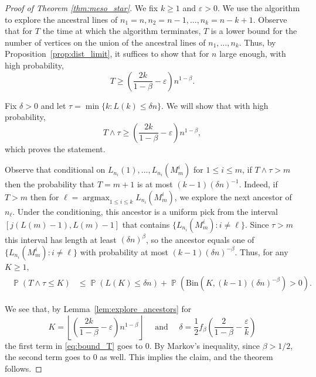 \documentclass[letterpaper,11pt,reqno]{amsart}
\theoremstyle{definition}
\renewcommand{\le}{\leqslant}
\renewcommand{\ge}{\geqslant}
\DeclareMathOperator{\pr}{\mathds{P}}
\DeclareMathOperator{\argmax}{argmax}
\begin{document}
{\begin{proof}[Proof of Theorem \ref{thm:meso_star}]
We fix $k\ge 1$ and $\varepsilon>0$. We use the algorithm to explore the ancestral lines of $n_1=n, n_2=n-1,\dots, n_k=n-k+1$. Observe that for $T$ the time at which the algorithm terminates, $T$ is a lower bound for the number of vertices on the union of the ancestral lines of $n_1,\dots, n_k$. Thus, by Proposition~\ref{prop:dist_limit}, it suffices to show that for  $n$ large enough, with high probability,
\[T\ge \left(  \frac{2k}{1-\beta}-\varepsilon \right)n^{1-\beta} .\] 

Fix $\delta>0$ and let  $\tau=\min\{k:L(k)\le \delta n \}$.
We will show that with high probability, \[T\wedge \tau \ge  \left(  \frac{2k}{1-\beta}-\varepsilon\right) n^{1-\beta},\] which proves the statement. 

Observe that conditional on $L_{n_i}(1), \dots, L_{n_i}(M^i_{m})$ for $1\le i \le m$, if $T\wedge \tau >m$ then the probability that $T=m+1$ is at most $(k-1)(\delta n)^{-1}$. Indeed, if $T>m$ then for $\ell=\argmax_{1\le i\le k}L_{n_i}(M^i_m)$, we explore the next ancestor of $n_\ell$. Under the conditioning, this ancestor is a uniform pick from the interval 
$[j(L(m)-1), L(m)-1]$ that contains $\{L_{n_i}(M^i_m):i\ne\ell\}$. Since $\tau>m$ this interval has length at least $(\delta n)^\beta$, so the ancestor equals one of $\{L_{n_i}(M^i_m):i\ne\ell\}$ with probability at most $(k-1)(\delta n)^{-\beta}$. Thus, for any $K\ge 1$, 
\begin{align} \begin{split}\label{eq:bound_T}\pr(T\wedge \tau \le  K)
&\le \pr(L(K)\le \delta n)+\pr(\text{Bin}(K, (k-1) (\delta n )^{-\beta})>0).\end{split}
\end{align}


We see that, by Lemma~\ref{lem:explore_ancestors} for \[K=\left \lfloor \left(  \frac{2k}{1-\beta}-\varepsilon \right) n^{1-\beta}\right\rfloor \quad \text{ and }\quad \delta= \frac{1}{2}f_\beta\left(\frac{2}{1-\beta}-\frac{\varepsilon}{k} \right) \] the first term in \eqref{eq:bound_T} goes to $0$. By Markov's inequality, since $\beta>1/2$, the second term goes to $0$ as well. This implies the claim, and the theorem follows. 


\end{proof}}
\end{document}
